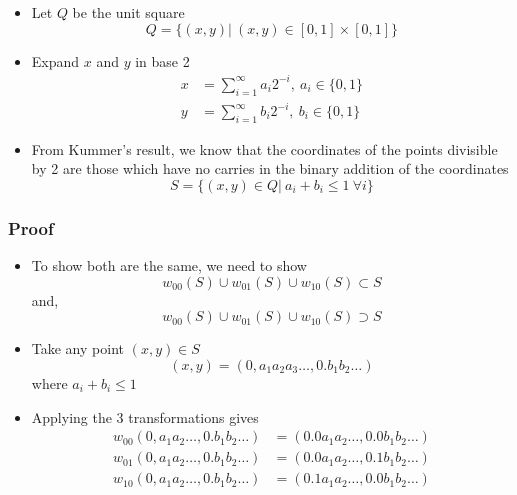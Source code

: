 \documentclass{beamer}
\begin{document}
\begin{frame}
    \begin{itemize}
        \item Let $Q$ be the unit square 
        \begin{equation*}
            Q = \{(x,y) | \ (x,y) \in [0,1] \times [0,1]\}
        \end{equation*}
        \item Expand $x$ and $y$ in base 2
        \begin{align*}
            x &= \sum_{i=1}^\infty a_i 2^{-i}, \ a_i \in \{0,1\} \\
            y &= \sum_{i=1}^\infty b_i 2^{-i}, \ b_i \in \{0,1\}
        \end{align*}
        \item From Kummer's result, we know that the coordinates of the points divisible by 2 are those which have no carries in the binary addition of the coordinates
        \begin{equation*}
            S = \{(x,y) \in Q| \ a_i + b_i \leq 1 \ \forall i\}
        \end{equation*} 
    \end{itemize}
\end{frame}


\begin{frame}
    \frametitle{Proof} %
    \begin{itemize}
        \item To show both are the same, we need to show
        \begin{equation*}
            w_{00}(S) \cup w_{01}(S) \cup w_{10}(S) \subset S 
        \end{equation*}
        and, 
        \begin{equation*}
            w_{00}(S) \cup w_{01}(S) \cup w_{10}(S) \supset S
        \end{equation*}
        \item Take any point $(x,y) \in S$ 
        \begin{equation*}
            (x,y) = (0,a_1a_2a_3\dots,0.b_1 b_2 \dots)
        \end{equation*}
        where $a_i + b_i \leq 1$
        \item Applying the 3 transformations gives 
        \begin{align*}
            w_{00}(0,a_1a_2\dots,0.b_1 b_2 \dots) &= (0.0a_1a_2\dots,0.0b_1 b_2 \dots) \\
            w_{01}(0,a_1a_2\dots,0.b_1 b_2 \dots) &= (0.0a_1a_2\dots,0.1b_1 b_2 \dots) \\
            w_{10}(0,a_1a_2\dots,0.b_1 b_2 \dots) &= (0.1a_1a_2\dots,0.0b_1 b_2 \dots)
        \end{align*}
    \end{itemize}
\end{frame}
\end{document}
